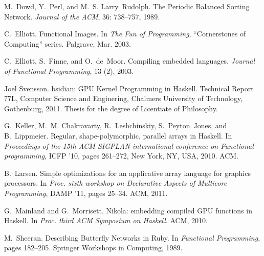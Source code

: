 \documentclass[]{sigplanconf}
\begin{document}
\begin{thebibliography}{}
M.~Dowd, Y.~Perl, and M.~S. Larry~Rudolph.
\newblock The {P}eriodic {B}alanced {S}orting {N}etwork.
\newblock \emph{Journal of the ACM}, 36: 738--757, 1989.

C.~Elliott.
\newblock Functional {I}mages.
\newblock In \emph{The Fun of Programming}, ``Cornerstones of Computing''
  series. Palgrave, Mar. 2003.

C.~Elliott, S.~Finne, and O.~de~Moor.
\newblock Compiling embedded languages.
\newblock \emph{Journal of Functional Programming}, 13 (2), 2003.

{J}oel {S}vensson.
bsidian: {GPU} {K}ernel {P}rogramming in {H}askell.
\newblock Technical Report 77L, {C}omputer {S}cience and {E}nginering,
  {C}halmers {U}niversity of {T}echnology, {G}othenburg, 2011.
\newblock Thesis for the degree of Licentiate of Philosophy.

G.~Keller, M.~M. Chakravarty, R.~Leshchinskiy, S.~Peyton~Jones, and
  B.~Lippmeier.
\newblock Regular, shape-polymorphic, parallel arrays in {H}askell.
\newblock In \emph{Proceedings of the 15th ACM SIGPLAN international conference
  on Functional programming}, ICFP '10, pages 261--272, New York, NY, USA,
  2010. ACM.

B.~Larsen.
\newblock Simple optimizations for an applicative array language for graphics
  processors.
\newblock In \emph{Proc. sixth workshop on {D}eclarative {A}spects of
  {M}ulticore {P}rogramming}, DAMP '11, pages 25--34. ACM, 2011.

G.~Mainland and G.~Morrisett.
\newblock Nikola: embedding compiled {GPU} functions in {H}askell.
\newblock In \emph{Proc. third ACM Symposium on Haskell}. ACM, 2010.

M.~Sheeran.
\newblock Describing {B}utterfly {N}etworks in {R}uby.
\newblock In \emph{Functional Programming}, pages 182--205. Springer Workshops
  in Computing, 1989.



\end{thebibliography}
\end{document}
